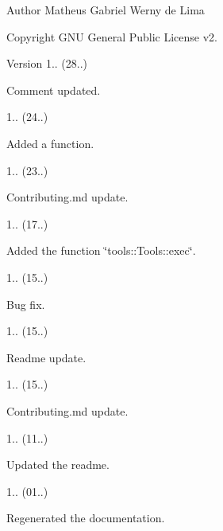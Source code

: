\begin{DoxyAuthor}{Author}
Matheus Gabriel Werny de Lima 
\end{DoxyAuthor}
\begin{DoxyCopyright}{Copyright}
G\+NU General Public License v2. 
\end{DoxyCopyright}
\begin{DoxyVersion}{Version}
1.. (28..)
\begin{DoxyItemize}
\item Comment updated. 
\end{DoxyItemize}

1.. (24..)
\begin{DoxyItemize}
\item Added a function. 
\end{DoxyItemize}

1.. (23..)
\begin{DoxyItemize}
\item Contributing.\+md update. 
\end{DoxyItemize}

1.. (17..)
\begin{DoxyItemize}
\item Added the function \char`\"{}tools\+::\+Tools\+::exec\char`\"{}. 
\end{DoxyItemize}

1.. (15..)
\begin{DoxyItemize}
\item Bug fix. 
\end{DoxyItemize}

1.. (15..)
\begin{DoxyItemize}
\item Readme update. 
\end{DoxyItemize}

1.. (15..)
\begin{DoxyItemize}
\item Contributing.\+md update. 
\end{DoxyItemize}

1.. (11..)
\begin{DoxyItemize}
\item Updated the readme. 
\end{DoxyItemize}

1.. (01..)
\begin{DoxyItemize}
\item Regenerated the documentation. 
\end{DoxyItemize}


\end{DoxyVersion}
